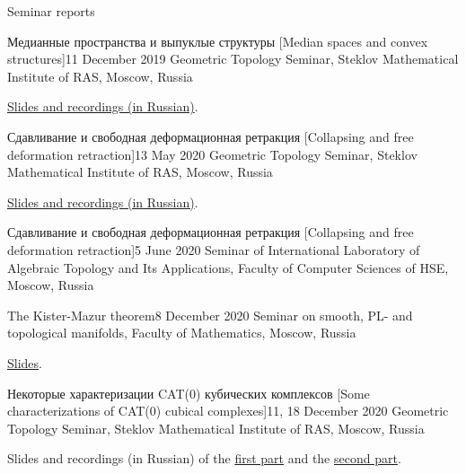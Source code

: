 \documentclass{resume}
\begin{document}
\begin{rSection}{Seminar reports}
  \begin{rSubsection}{Медианные пространства и выпуклые структуры [Median spaces and convex structures]}{11 December 2019}{}
    Geometric Topology Seminar, Steklov Mathematical Institute of RAS, Moscow, Russia
    \vspace{0.5em}

    \href{http://www.mathnet.ru/php/seminars.phtml?option_lang=eng&presentid=26027}{Slides and recordings (in Russian)}.
  \end{rSubsection}

  \begin{rSubsection}{Сдавливание и свободная деформационная ретракция [Collapsing and free deformation retraction]}{13 May 2020}{}
    Geometric Topology Seminar, Steklov Mathematical Institute of RAS, Moscow, Russia
    \vspace{0.5em}

    \href{http://www.mathnet.ru/php/seminars.phtml?option_lang=eng&presentid=27125}{Slides and recordings (in Russian)}.
  \end{rSubsection}

  \begin{rSubsection}{Сдавливание и свободная деформационная ретракция [Collapsing and free
      deformation retraction]}{5 June 2020}{}
    Seminar of International Laboratory of Algebraic Topology and Its Applications, Faculty of
    Computer Sciences of HSE, Moscow, Russia
  \end{rSubsection}

  \begin{rSubsection}{The Kister-Mazur theorem}{8 December 2020}{}
    Seminar on smooth, PL- and topological manifolds, Faculty of Mathematics, Moscow, Russia
    \vspace{0.5em}

    \href{https://drive.google.com/file/d/1WE5F7Bgqm7x6pB6irsLrthQtfk3Psl7e/view}{Slides}.
  \end{rSubsection}

  \begin{rSubsection}{Некоторые характеризации CAT(0) кубических комплексов [Some characterizations
      of CAT(0) cubical complexes]}{11, 18 December 2020}{}
    Geometric Topology Seminar, Steklov Mathematical Institute of RAS, Moscow, Russia
    \vspace{0.5em}

    Slides and recordings (in Russian) of the
    \href{http://www.mathnet.ru/php/seminars.phtml?option_lang=eng&presentid=28954}{first part} and
    the \href{http://www.mathnet.ru/php/seminars.phtml?option_lang=eng&presentid=29250}{second part}.
  \end{rSubsection}


\end{rSection}
\end{document}
